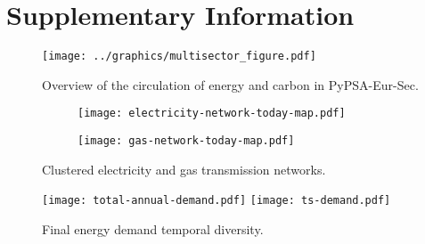 
\section*{Supplementary Information}
\label{sec:si}
\normalsize

\begin{figure}[ht!]
    \centering
    \texttt{[image: ../graphics/multisector\_figure.pdf]}
    \caption{Overview of the circulation of energy and carbon in PyPSA-Eur-Sec.}
    \label{fig:multisector}
\end{figure}

\begin{figure}[ht!]
    \centering
\begin{subfigure}[t]{0.48\textwidth}
    \centering
    \texttt{[image: electricity-network-today-map.pdf]}
\end{subfigure}
\begin{subfigure}[t]{0.48\textwidth}
    \centering
    \texttt{[image: gas-network-today-map.pdf]}
\end{subfigure}
\caption{Clustered electricity and gas transmission networks.}
\label{fig:clustered-networks}
\end{figure}

\begin{figure}[ht!]
    \centering
    \texttt{[image: total-annual-demand.pdf]}
    \texttt{[image: ts-demand.pdf]}
    \caption{Final energy demand temporal diversity.}
    \label{fig:demand-time}
\end{figure}

